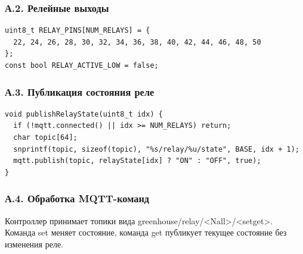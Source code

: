 \documentclass[a4paper,14pt]{extarticle}
\renewcommand{\texttt}[1]{\textnormal{#1}}
\begin{document}
\hypertarget{ux430.2.-ux440ux435ux43bux435ux439ux43dux44bux435-ux432ux44bux445ux43eux434ux44b}{%
\subsubsection{А.2. Релейные
выходы}\label{ux430.2.-ux440ux435ux43bux435ux439ux43dux44bux435-ux432ux44bux445ux43eux434ux44b}}

\par\noindent\begin{minipage}{\linewidth}
\begin{verbatim}
uint8_t RELAY_PINS[NUM_RELAYS] = {
  22, 24, 26, 28, 30, 32, 34, 36, 38, 40, 42, 44, 46, 48, 50
};
const bool RELAY_ACTIVE_LOW = false;
\end{verbatim}
\end{minipage}\par

\hypertarget{ux430.3.-ux43fux443ux431ux43bux438ux43aux430ux446ux438ux44f-ux441ux43eux441ux442ux43eux44fux43dux438ux44f-ux440ux435ux43bux435}{%
\subsubsection{А.3. Публикация состояния
реле}\label{ux430.3.-ux43fux443ux431ux43bux438ux43aux430ux446ux438ux44f-ux441ux43eux441ux442ux43eux44fux43dux438ux44f-ux440ux435ux43bux435}}

\par\noindent\begin{minipage}{\linewidth}
\begin{verbatim}
void publishRelayState(uint8_t idx) {
  if (!mqtt.connected() || idx >= NUM_RELAYS) return;
  char topic[64];
  snprintf(topic, sizeof(topic), "%s/relay/%u/state", BASE, idx + 1);
  mqtt.publish(topic, relayState[idx] ? "ON" : "OFF", true);
}
\end{verbatim}
\end{minipage}\par

\hypertarget{ux430.4.-ux43eux431ux440ux430ux431ux43eux442ux43aux430-mqtt-ux43aux43eux43cux430ux43dux434}{%
\subsubsection{А.4. Обработка
MQTT-команд}\label{ux430.4.-ux43eux431ux440ux430ux431ux43eux442ux43aux430-mqtt-ux43aux43eux43cux430ux43dux434}}

Контроллер принимает топики вида
\texttt{greenhouse/relay/\textless{}N\textbar{}all\textgreater{}/\textless{}set\textbar{}get\textgreater{}}.
Команда \texttt{set} меняет состояние, команда \texttt{get} публикует
текущее состояние без изменения реле.
\end{document}
